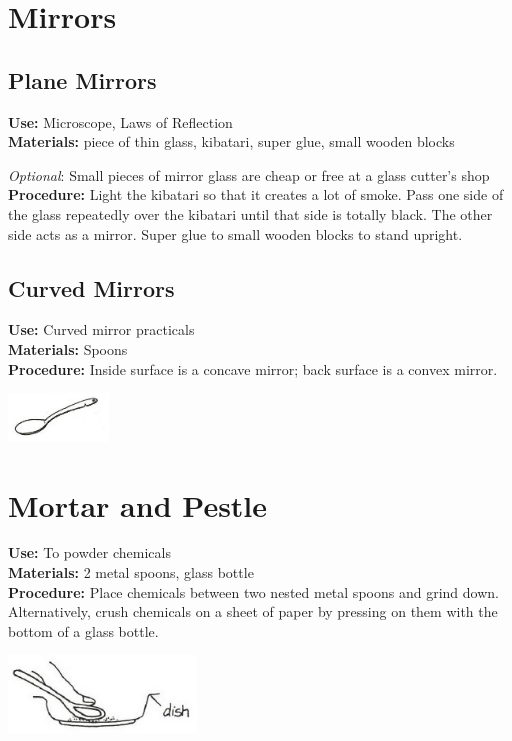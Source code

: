 \begin{multicols}{2}
\section{Mirrors} 
\label{sec:mirrors}

\subsection{Plane Mirrors} 
\vspace{-6pt}
\textbf{Use:} Microscope, Laws of Reflection\\
\textbf{Materials:} piece of thin glass, kibatari, super glue, small wooden blocks 

\noindent \emph{Optional}: Small pieces of mirror glass are cheap or free at a glass cutter's shop\\
\textbf{Procedure:} Light the kibatari so that it creates a lot of smoke.  Pass one side of the glass repeatedly over the kibatari until that side is totally black.  The other side acts as a mirror. Super glue to small wooden blocks to stand upright.

\subsection{Curved Mirrors} 
\vspace{-6pt}
\textbf{Use:} Curved mirror practicals\\
\textbf{Materials:} Spoons\\
\textbf{Procedure:} Inside surface is a concave mirror; back surface is a convex mirror.
\begin{center}
\includegraphics[width=0.2\textwidth]{./img/source/spoon.jpg}
\end{center}

\section{Mortar and Pestle} 
\label{sec:mortar-and-pestle}
\vspace{-10pt}
\textbf{Use:} To powder chemicals\\
\textbf{Materials:} 2 metal spoons, glass bottle\\
\textbf{Procedure:} Place chemicals between two nested metal spoons and grind down. 
Alternatively, crush chemicals on a sheet of paper by pressing on them with the bottom of a glass bottle.
\begin{center}
\includegraphics[width=5cm]{./img/vso/mortar-pestle.jpg}
\end{center}


\end{multicols}
